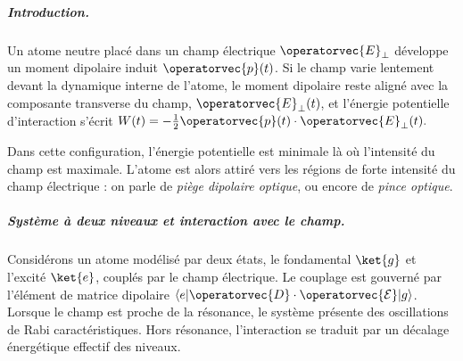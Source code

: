 \subparagraph{Introduction.}
Un atome neutre placé dans un champ électrique $\operatorvec{E}_\perp$ développe un moment dipolaire induit $\operatorvec{p}(t)$. Si le champ varie lentement devant la dynamique interne de l’atome, le moment dipolaire reste aligné avec la composante transverse du champ, $\operatorvec{E}_\perp(t)$, et l’énergie potentielle d’interaction s’écrit 
\(
W(t) = -\frac{1}{2} \operatorvec{p}(t) \cdot \operatorvec{E}_\perp(t).
\)

Dans cette configuration, l’énergie potentielle est minimale là où l’intensité du champ est maximale. L’atome est alors attiré vers les régions de forte intensité du champ électrique : on parle de \textit{piège dipolaire optique}, ou encore de \textit{pince optique}.



\subparagraph{Système à deux niveaux et interaction avec le champ.}

Considérons un atome modélisé par deux états, le fondamental $\ket{g}$ et l’excité $\ket{e}$, couplés par le champ électrique. Le couplage est gouverné par l’élément de matrice dipolaire $\langle e \vert \operatorvec{D} \cdot \operatorvec{\mathcal{E}} \vert g \rangle$. Lorsque le champ est proche de la résonance, le système présente des oscillations de Rabi caractéristiques. Hors résonance, l’interaction se traduit par un décalage énergétique effectif des niveaux.

